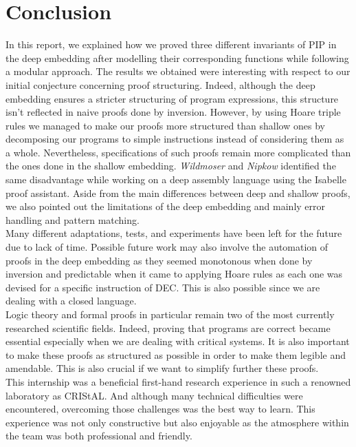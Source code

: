 \chapter{Conclusion}
In this report, we explained how we proved three different invariants of PIP in the deep embedding after modelling their corresponding functions while following a modular approach. The results we obtained were interesting with respect to our initial conjecture concerning proof structuring. Indeed, although the deep embedding ensures a stricter structuring of program expressions, this structure isn't reflected in naive proofs done by inversion. However, by using Hoare triple rules we managed to make our proofs more structured than shallow ones by decomposing our programs to simple instructions instead of considering them as a whole. Nevertheless, specifications of such proofs remain more complicated than the ones done in the shallow embedding. \textit{Wildmoser} and \textit{Nipkow} identified the same disadvantage while working on a deep assembly language using the Isabelle proof assistant\cite{Wildmoser}. Aside from the main differences between deep and shallow proofs, we also pointed out the limitations of the deep embedding and mainly error handling and pattern matching. \\

Many different adaptations, tests, and experiments have been left for the future due to lack of time. Possible future work may also involve the automation of proofs in the deep embedding as they seemed monotonous when done by inversion and predictable when it came to applying Hoare rules as each one was devised for a specific instruction of DEC. This is also possible since we are dealing with a closed language. \\

Logic theory and formal proofs in particular remain two of the most currently researched scientific fields. Indeed, proving that programs are correct became essential especially when we are dealing with critical systems. It is also important to make these proofs as structured as possible in order to make them legible and amendable. This is also crucial if we want to simplify further these proofs.  \\   

This internship was a beneficial first-hand research experience in such a renowned laboratory as CRIStAL. And although many technical difficulties were encountered, overcoming those challenges was the best way to learn. This experience was not only  constructive but also enjoyable as the atmosphere within the team was both professional and friendly. \\ 